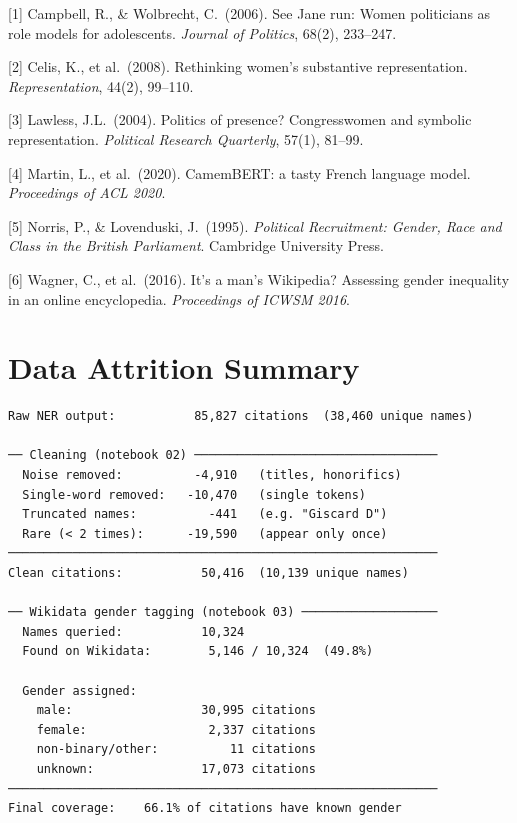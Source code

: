 \documentclass{article}
\begin{document}
{
\small

[1] Campbell, R., \& Wolbrecht, C.\ (2006). See Jane run: Women politicians as
role models for adolescents. \emph{Journal of Politics}, 68(2), 233--247.

[2] Celis, K., et al.\ (2008). Rethinking women's substantive representation.
\emph{Representation}, 44(2), 99--110.

[3] Lawless, J.L.\ (2004). Politics of presence? Congresswomen and symbolic
representation. \emph{Political Research Quarterly}, 57(1), 81--99.

[4] Martin, L., et al.\ (2020). CamemBERT: a tasty French language model.
\emph{Proceedings of ACL 2020}.

[5] Norris, P., \& Lovenduski, J.\ (1995). \emph{Political Recruitment: Gender,
Race and Class in the British Parliament}. Cambridge University Press.

[6] Wagner, C., et al.\ (2016). It's a man's Wikipedia? Assessing gender
inequality in an online encyclopedia. \emph{Proceedings of ICWSM 2016}.

}

\appendix

\section{Data Attrition Summary}

\begin{verbatim}
Raw NER output:           85,827 citations  (38,460 unique names)

── Cleaning (notebook 02) ──────────────────────────────────
  Noise removed:          -4,910   (titles, honorifics)
  Single-word removed:   -10,470   (single tokens)
  Truncated names:          -441   (e.g. "Giscard D")
  Rare (< 2 times):      -19,590   (appear only once)
────────────────────────────────────────────────────────────
Clean citations:           50,416  (10,139 unique names)

── Wikidata gender tagging (notebook 03) ───────────────────
  Names queried:           10,324
  Found on Wikidata:        5,146 / 10,324  (49.8%)

  Gender assigned:
    male:                  30,995 citations
    female:                 2,337 citations
    non-binary/other:          11 citations
    unknown:               17,073 citations
────────────────────────────────────────────────────────────
Final coverage:    66.1% of citations have known gender
\end{verbatim}

\newpage

\end{document}
